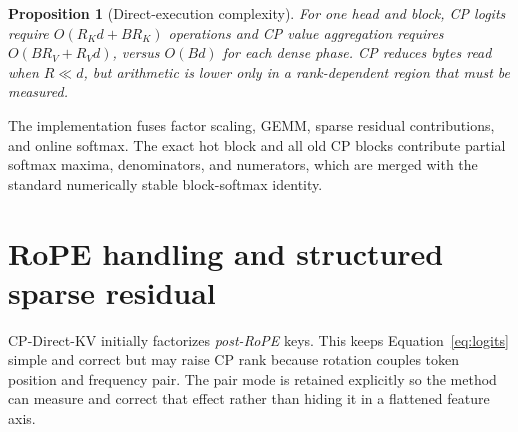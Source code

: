 \documentclass[11pt]{article}
\newtheorem{proposition}{Proposition}
\begin{document}
\begin{proposition}[Direct-execution complexity]
For one head and block, CP logits require $O(R_Kd+BR_K)$ operations and CP value aggregation
requires $O(BR_V+R_Vd)$, versus $O(Bd)$ for each dense phase. CP reduces bytes read when
$R\ll d$, but arithmetic is lower only in a rank-dependent region that must be measured.
\end{proposition}

The implementation fuses factor scaling, GEMM, sparse residual contributions, and online softmax.
The exact hot block and all old CP blocks contribute partial softmax maxima, denominators, and
numerators, which are merged with the standard numerically stable block-softmax identity.

\begin{center}
\end{center}

\section{RoPE handling and structured sparse residual}

CP-Direct-KV initially factorizes \emph{post-RoPE} keys. This keeps Equation~\eqref{eq:logits}
simple and correct but may raise CP rank because rotation couples token position and frequency pair.
The pair mode is retained explicitly so the method can measure and correct that effect rather than
hiding it in a flattened feature axis.
\end{document}
